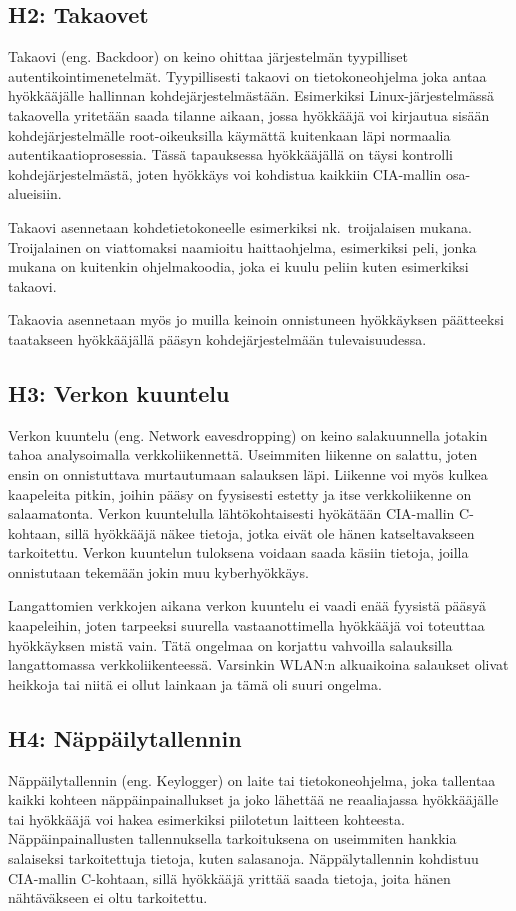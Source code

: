\subsection{H2: Takaovet}
Takaovi (eng. Backdoor) on keino ohittaa järjestelmän tyypilliset autentikointimenetelmät. Tyypillisesti takaovi on tietokoneohjelma joka antaa hyökkääjälle hallinnan kohdejärjestelmästään. Esimerkiksi Linux-järjestelmässä takaovella yritetään saada tilanne aikaan, jossa hyökkääjä voi kirjautua sisään kohdejärjestelmälle root-oikeuksilla käymättä kuitenkaan läpi normaalia autentikaatioprosessia. Tässä tapauksessa hyökkääjällä on täysi kontrolli kohdejärjestelmästä, joten hyökkäys voi kohdistua kaikkiin CIA-mallin osa-alueisiin.

Takaovi asennetaan kohdetietokoneelle esimerkiksi nk.\ troijalaisen mukana. Troijalainen on viattomaksi naamioitu haittaohjelma, esimerkiksi peli, jonka mukana on kuitenkin ohjelmakoodia, joka ei kuulu peliin kuten esimerkiksi takaovi.

Takaovia asennetaan myös jo muilla keinoin onnistuneen hyökkäyksen päätteeksi taatakseen hyökkääjällä pääsyn kohdejärjestelmään tulevaisuudessa.~\cite{tipton2007information}

\subsection{H3: Verkon kuuntelu}
Verkon kuuntelu (eng. Network eavesdropping) on keino salakuunnella jotakin tahoa analysoimalla verkkoliikennettä. Useimmiten liikenne on salattu, joten ensin on onnistuttava murtautumaan salauksen läpi. Liikenne voi myös kulkea kaapeleita pitkin, joihin pääsy on fyysisesti estetty ja itse verkkoliikenne on salaamatonta. Verkon kuuntelulla lähtökohtaisesti hyökätään CIA-mallin C-kohtaan, sillä hyökkääjä näkee tietoja, jotka eivät ole hänen katseltavakseen tarkoitettu. Verkon kuuntelun tuloksena voidaan saada käsiin tietoja, joilla onnistutaan tekemään jokin muu kyberhyökkäys.

Langattomien verkkojen aikana verkon kuuntelu ei vaadi enää fyysistä pääsyä kaapeleihin, joten tarpeeksi suurella vastaanottimella hyökkääjä voi toteuttaa hyökkäyksen mistä vain. Tätä ongelmaa on korjattu vahvoilla salauksilla langattomassa verkkoliikenteessä. Varsinkin WLAN:n alkuaikoina salaukset olivat heikkoja tai niitä ei ollut lainkaan ja tämä oli suuri ongelma.~\cite{andress2014basics}

\subsection{H4: Näppäilytallennin}
Näppäilytallennin (eng. Keylogger) on laite tai tietokoneohjelma, joka tallentaa kaikki kohteen näppäinpainallukset ja joko lähettää ne reaaliajassa hyökkääjälle tai hyökkääjä voi hakea esimerkiksi piilotetun laitteen kohteesta. Näppäinpainallusten tallennuksella tarkoituksena on useimmiten hankkia salaiseksi tarkoitettuja tietoja, kuten salasanoja. Näppälytallennin kohdistuu CIA-mallin C-kohtaan, sillä hyökkääjä yrittää saada tietoja, joita hänen nähtäväkseen ei oltu tarkoitettu.~\cite{keylogger}

